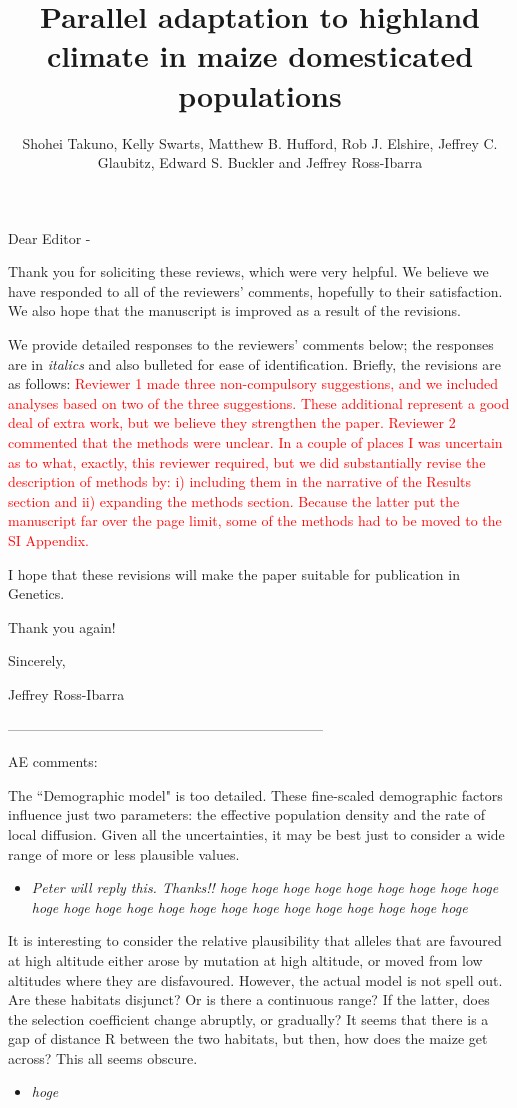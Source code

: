 \documentclass[onecolumn,oneside,letterpaper]{article}
\title{Parallel adaptation to highland climate in maize domesticated populations}
\author{
 Shohei Takuno, Kelly Swarts, Matthew B. Hufford, Rob J. Elshire, Jeffrey C. Glaubitz, Edward S. Buckler and Jeffrey Ross-Ibarra
   }
\newcommand{\st}[1]{\textcolor{red}{ #1}}
\begin{document}
\maketitle
Dear Editor - 

Thank you for soliciting these reviews, which were very helpful.   We believe we have responded to all of the reviewers' comments, hopefully to their satisfaction.  We also hope that the manuscript is improved as a result of the revisions.  

We provide detailed responses to the reviewers' comments below; the responses are in \textit{italics} and also bulleted for ease of identification.  
Briefly, the revisions are as follows:  
\st{Reviewer 1 made three non-compulsory suggestions, and we included analyses based on two of the three suggestions.  
These additional represent a good deal of extra work, but we believe they strengthen the paper. 
Reviewer 2 commented that the methods were unclear.  
In a couple of places I was uncertain as to what, exactly, this reviewer required, but we did substantially revise the description of methods by: i) including them in the narrative of the Results section and ii) expanding the methods section.   
Because the latter put the manuscript far over the page limit, some of the methods had to be moved to the SI Appendix.}  

I hope that these revisions will make the paper suitable for publication in Genetics. 

Thank you again! 

Sincerely, 

Jeffrey Ross-Ibarra

--------------------------------------------------------------------


AE comments: 

The ``Demographic model" is too detailed.  These fine-scaled demographic factors influence just two parameters: the effective population density and the rate of local diffusion.  Given all the uncertainties, it may be best just to consider a wide range of more or less plausible values. 
\setlength{\parskip}{-5.0pt}
\begin{itemize}
\item \textit{ Peter will reply this.  Thanks!!  hoge hoge hoge hoge hoge hoge hoge hoge hoge hoge hoge hoge hoge hoge hoge hoge hoge hoge hoge hoge hoge hoge hoge }
\end{itemize}
\setlength{\parskip}{10.0pt}

It is interesting to consider the relative plausibility that alleles that are favoured at high altitude either arose by mutation at high altitude, or moved from low altitudes where they are disfavoured.  However, the actual model is not spell out.  Are these habitats disjunct?  Or is there a continuous range? If the latter, does the selection coefficient change abruptly, or gradually?  It seems that there is a gap of distance R between the two habitats, but then, how does the maize get across?  This all seems obscure. 
\setlength{\parskip}{-5.0pt}
\begin{itemize}
\item \textit{ hoge }
\end{itemize}
\setlength{\parskip}{10.0pt}
\end{document}
